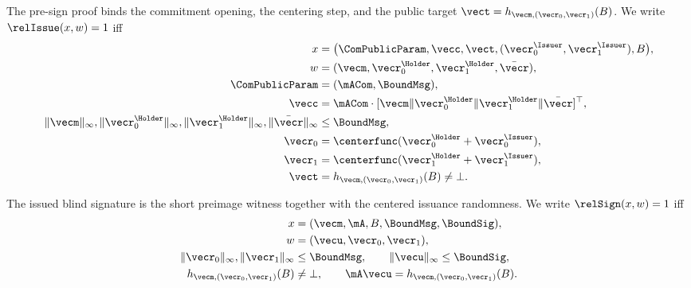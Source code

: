 The pre-sign proof binds the commitment opening, the centering step, and the public target
\(\vect=h_{\vecm,(\vecr_0,\vecr_1)}(B)\). We write \(\relIssue(x,w)=1\) iff
\[
\begin{aligned}
  x&=\bigl(\ComPublicParam,\vecc,\vect,
  (\vecr_0^{\Issuer},\vecr_1^{\Issuer}),B\bigr),\\
  w&=(\vecm,\vecr_0^{\Holder},\vecr_1^{\Holder},\bar\vecr),\\
  \ComPublicParam&=(\mACom,\BoundMsg),\\
  \vecc&=\mACom\cdot[\vecm\Vert \vecr_0^{\Holder}\Vert \vecr_1^{\Holder}\Vert \bar\vecr]^\top,\\
  \|\vecm\|_\infty,\|\vecr_0^{\Holder}\|_\infty,\|\vecr_1^{\Holder}\|_\infty,\|\bar\vecr\|_\infty&\le \BoundMsg,\\
  \vecr_0&=\centerfunc(\vecr_0^{\Holder}+\vecr_0^{\Issuer}),\\
  \vecr_1&=\centerfunc(\vecr_1^{\Holder}+\vecr_1^{\Issuer}),\\
  \vect&=h_{\vecm,(\vecr_0,\vecr_1)}(B)\neq\bot.
\end{aligned}
\]

The issued blind signature is the short preimage witness together with the centered issuance randomness. We write
\(\relSign(x,w)=1\) iff
\[
\begin{aligned}
  x&=(\vecm,\mA,B,\BoundMsg,\BoundSig),\\
  w&=(\vecu,\vecr_0,\vecr_1),\\
  \|\vecr_0\|_\infty,\|\vecr_1\|_\infty&\le \BoundMsg,\qquad
  \|\vecu\|_\infty\le \BoundSig,\\
  h_{\vecm,(\vecr_0,\vecr_1)}(B)&\neq\bot,\qquad
  \mA\vecu=h_{\vecm,(\vecr_0,\vecr_1)}(B).
\end{aligned}
\]

